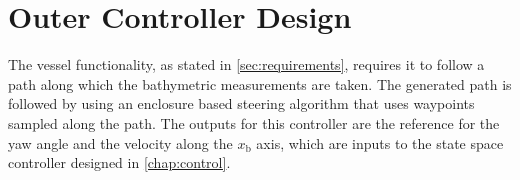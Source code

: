 \chapter{Outer Controller Design}\label{chap:outerController}
The vessel functionality, as stated in \autoref{sec:requirements}, requires it to follow a path along which the bathymetric measurements are taken.   The generated path is followed by using an enclosure based steering algorithm \cite[pp. 258-265]{TFossen} that uses waypoints sampled along the path. The outputs for this controller are the reference for the yaw angle and the velocity along the $x_\mathrm{b}$ axis, which are inputs to the state space controller designed in \autoref{chap:control}. 